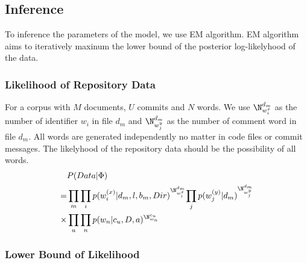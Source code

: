 \subsection{Inference}
\label{sec:infer}


To inference the parameters of the model, we use EM algorithm. EM algorithm aims to iteratively 
maxinum the lower bound of the posterior log-likelyhood of the data.

\subsubsection{Likelihood of Repository Data}
For a corpus with $M$ documents, $U$ commits and $N$ words. We use $\N_{w_i^x}^{d_m}$ as the 
number of identifier $w_i$ in file $d_m$ and $\N_{w_j^y}^{d_m}$ as the number of comment word in file $d_m$. 
All words are generated independently no matter in code files or commit messages. 
The likelyhood of the repository data should be the possibility of all words.
\textcolor{red}{
\begin{align} 
\begin{split}
&P(Data|\Phi)\\
=&\prod _{ m }{\prod _{ i }{p(w_i^{(x)}|d_m,l,b_m,Dir)^{\N_{w_i^x}^{d_m}}}} {\prod _{ j }{p(w_j^{(y)}|d_m)^{\N_{w_j^y}^{d_m}}}} \\
\times& \prod _{ u}\prod _{ n }{p(w_n|c_u,D,a)^{\N_{w_n}^{c_u}}}\\
\end{split}					
\end{align}
}
\subsubsection{Lower Bound of Likelihood}

